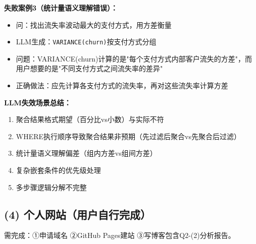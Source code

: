 \documentclass[12pt,a4paper]{article}
\begin{document}
\textbf{失败案例3（统计量语义理解错误）：}
\begin{itemize}
    \item 问：找出流失率波动最大的支付方式，用方差衡量
    \item LLM生成：\texttt{VARIANCE(churn)}按支付方式分组
    \item 问题：VARIANCE(churn)计算的是"每个支付方式内部客户流失的方差"，而用户想要的是"不同支付方式之间流失率的差异"
    \item 正确做法：应先计算各支付方式的流失率，再对这些流失率计算方差
\end{itemize}

\textbf{LLM失效场景总结：}
\begin{enumerate}
    \item 聚合结果格式期望（百分比vs小数）与实际不符
    \item WHERE执行顺序导致聚合结果非预期（先过滤后聚合vs先聚合后过滤）
    \item 统计量语义理解偏差（组内方差vs组间方差）
    \item 复杂嵌套条件的优先级处理
    \item 多步骤逻辑分解不完整
\end{enumerate}

\subsection{(4) 个人网站（用户自行完成）}

需完成：①申请域名 ②GitHub Pages建站 ③写博客包含Q2-(2)分析报告。
\end{document}

